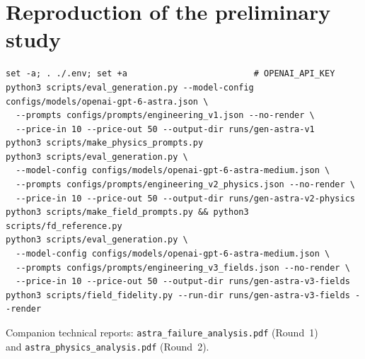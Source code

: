\documentclass[11pt,a4paper]{article}
\begin{document}
\section{Reproduction of the preliminary study}
\begin{scriptsize}
\begin{verbatim}
set -a; . ./.env; set +a                         # OPENAI_API_KEY
python3 scripts/eval_generation.py --model-config configs/models/openai-gpt-6-astra.json \
  --prompts configs/prompts/engineering_v1.json --no-render \
  --price-in 10 --price-out 50 --output-dir runs/gen-astra-v1
python3 scripts/make_physics_prompts.py
python3 scripts/eval_generation.py \
  --model-config configs/models/openai-gpt-6-astra-medium.json \
  --prompts configs/prompts/engineering_v2_physics.json --no-render \
  --price-in 10 --price-out 50 --output-dir runs/gen-astra-v2-physics
python3 scripts/make_field_prompts.py && python3 scripts/fd_reference.py
python3 scripts/eval_generation.py \
  --model-config configs/models/openai-gpt-6-astra-medium.json \
  --prompts configs/prompts/engineering_v3_fields.json --no-render \
  --price-in 10 --price-out 50 --output-dir runs/gen-astra-v3-fields
python3 scripts/field_fidelity.py --run-dir runs/gen-astra-v3-fields --render
\end{verbatim}
\end{scriptsize}
Companion technical reports: \texttt{astra\_failure\_analysis.pdf} (Round~1)\\and \texttt{astra\_physics\_analysis.pdf} (Round~2).
\end{document}
